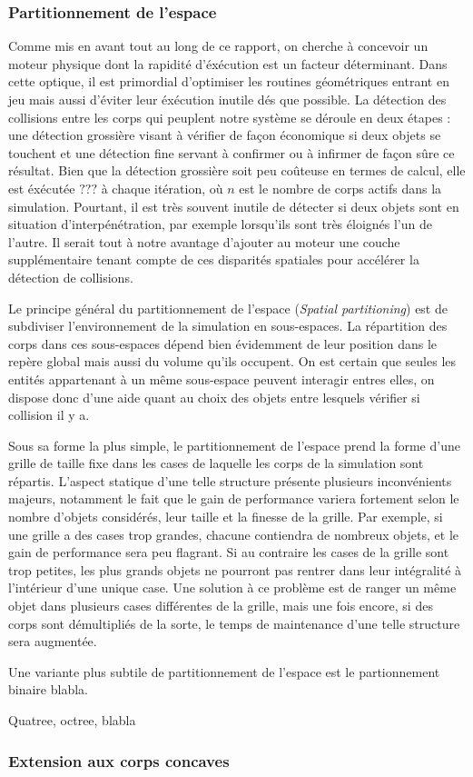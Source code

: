 \begin{figure}
  \centering
  
  \caption{}
  \label{tunneling3}
\end{figure}

\subsubsection{Partitionnement de l'espace}

Comme mis en avant tout au long de ce rapport, on cherche à concevoir
un moteur physique dont la rapidité d'éxécution est un facteur
déterminant. Dans cette optique, il est primordial d'optimiser les
routines géométriques entrant en jeu mais aussi d'éviter leur
éxécution inutile dés que possible. La détection des collisions entre
les corps qui peuplent notre système se déroule en deux étapes : une
détection grossière visant à vérifier de façon économique si deux
objets se touchent et une détection fine servant à confirmer ou à
infirmer de façon sûre ce résultat. Bien que la détection grossière
soit peu coûteuse en termes de calcul, elle est éxécutée $???$ à
chaque itération, o\`u $n$ est le nombre de corps actifs dans la
simulation. Pourtant, il est très souvent inutile de détecter si deux
objets sont en situation d'interpénétration, par exemple lorsqu'ils
sont très éloignés l'un de l'autre. Il serait tout à notre avantage
d'ajouter au moteur une couche supplémentaire tenant compte de ces
disparités spatiales pour accélérer la détection de collisions.

Le principe général du partitionnement de l'espace (\textit{Spatial
  partitioning}) est de subdiviser l'environnement de la simulation en
sous-espaces. La répartition des corps dans ces sous-espaces dépend
bien évidemment de leur position dans le repère global mais aussi du
volume qu'ils occupent. On est certain que seules les entités
appartenant à un même sous-espace peuvent interagir entres elles, on
dispose donc d'une aide quant au choix des objets entre lesquels
vérifier si collision il y a.

Sous sa forme la plus simple, le partitionnement de l'espace prend la
forme d'une grille de taille fixe dans les cases de laquelle les corps
de la simulation sont répartis. L'aspect statique d'une telle
structure présente plusieurs inconvénients majeurs, notamment le fait
que le gain de performance variera fortement selon le nombre d'objets
considérés, leur taille et la finesse de la grille. Par exemple, si
une grille a des cases trop grandes, chacune contiendra de nombreux
objets, et le gain de performance sera peu flagrant. Si au contraire
les cases de la grille sont trop petites, les plus grands objets ne
pourront pas rentrer dans leur intégralité à l'intérieur d'une unique
case. Une solution à ce problème est de ranger un même objet dans
plusieurs cases différentes de la grille, mais une fois encore, si des
corps sont démultipliés de la sorte, le temps de maintenance d'une
telle structure sera augmentée.

Une variante plus subtile de partitionnement de l'espace est le
partionnement binaire blabla.

Quatree, octree, blabla

\subsubsection{Extension aux corps concaves}


